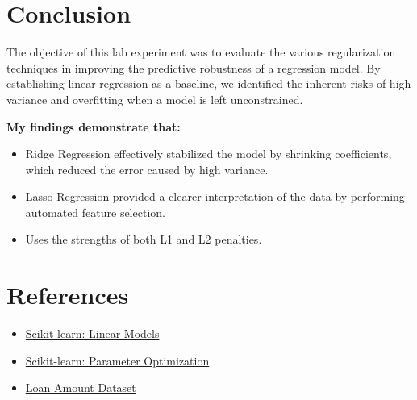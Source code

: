 \documentclass[11pt]{article}
\begin{document}
\section*{Conclusion}

The objective of this lab experiment was to evaluate the various regularization techniques in improving the predictive robustness of a regression model. By establishing linear regression as a baseline, we identified the inherent risks of high variance and overfitting when a model is left unconstrained.

\textbf{My findings demonstrate that:} 



\begin{itemize}
    \item \textbf{}  
   Ridge Regression effectively stabilized the model by shrinking coefficients, which reduced the error caused by high variance.

    \item \textbf{}  
    Lasso Regression provided a clearer interpretation of the data by performing automated feature selection.

    \item \textbf{}  
    Uses the strengths of both L1 and L2 penalties.
\end{itemize}





\section*{References}
\begin{itemize}
    \item \href{https://scikit-learn.org/stable/modules/linear_model.html}{Scikit-learn: Linear Models}
    \item \href{https://scikit-learn.org/stable/modules/grid_search.html}{Scikit-learn: Parameter Optimization}
    \item \href{https://www.kaggle.com/datasets/phileinsophos/predict-loan-amount-data}{Loan Amount Dataset}
\end{itemize}
\end{document}
